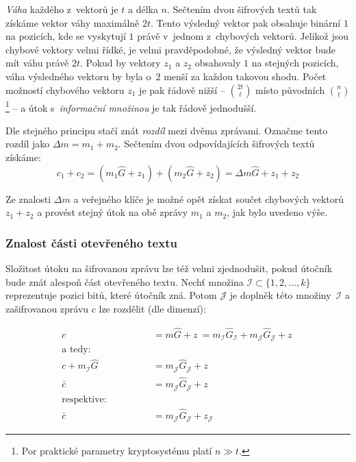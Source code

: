 \documentclass[thesis=M,czech,hidelinks]{FITthesis}[2012/06/26]
\newcommand{\0}{{\textcolor[gray]{0.80}{0}}}
\begin{document}
\emph{Váha} každého z~vektorů je $t$ a délka $n$. Sečtením dvou šifrových textů
tak získáme vektor váhy maximálně $2t$. Tento výsledný vektor pak obsahuje
binární $1$ na pozicích, kde se vyskytují $1$ právě v~jednom z~chybových
vektorů. Jelikož jsou chybové vektory velmi řídké, je velmi pravděpodobné, že
výsledný vektor bude mít váhu právě $2t$. Pokud by vektory $z_1$ a $z_2$
obsahovaly $1$ na stejných pozicích, váha výsledného vektoru by byla o~$2$ menší
za každou takovou shodu. Počet možností chybového vektoru $z_1$ je pak řádově
nižší -- $\binom{2t}{t}$ místo původních $\binom{n}{t}$\footnote{
    Por praktické parametry kryptosystému platí $n \gg t$.
} -- a útok s~\emph{informační množinou} je tak řádově jednodušší.

Dle stejného principu stačí znát \emph{rozdíl} mezi dvěma zprávami. Označme
tento rozdíl jako $\Delta m = m_1 + m_2$. Sečtením dvou odpovídajících šifrových
textů získáme:
$$
    c_1 + c_2 = (m_1\hat{G} + z_1) + (m_2\hat{G} + z_2) =
    \Delta m \hat{G} + z_1 + z_2
$$

Ze znalosti $\Delta m$ a veřejného klíče je možné opět získat součet chybových
vektorů $z_1 + z_2 $ a provést stejný útok na obě zprávy $m_1$ a $m_2$, jak bylo
uvedeno výše.


\subsubsection{Znalost části otevřeného textu}

Složitost útoku na šifrovanou zprávu lze též velmi zjednodušit, pokud útočník
bude znát alespoň část otevřeného textu. Nechť množina $\mathcal{I} \subset
\{1,2,\ldots,k\}$ reprezentuje pozici bitů, které útočník zná. Potom
$\mathcal{J}$ je doplněk této množiny~$\mathcal{I}$ a zašifrovanou zprávu $c$
lze rozdělit (dle dimenzí):

\begin{align*}
    c &= m\hat{G} + z~=
    m_{\mathcal{I}}\hat{G}_{\mathcal{I}} + m_{\mathcal{J}}\hat{G}_{\mathcal{J}} + z~\\
    \text{a tedy:} \qquad \qquad \\
    c + m_{\mathcal{I}}\hat{G} &= m_{\mathcal{J}}\hat{G}_{\mathcal{J}} + z~\\
                       \bar{c} &= m_{\mathcal{J}}\hat{G}_{\mathcal{J}} + z~\\
    \text{respektive:} \qquad \qquad \\
                       \bar{c} &= m_{\mathcal{J}}\hat{G}_{\mathcal{J}} + z_{\mathcal{J}}
\end{align*}
\end{document}
